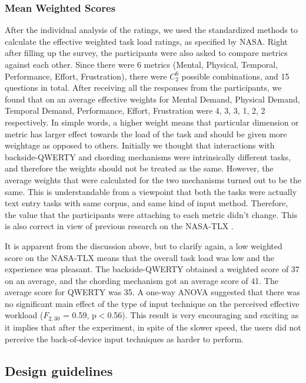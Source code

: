 \subsubsection{Mean Weighted Scores}
After the individual analysis of the ratings, we used the standardized methods to calculate the effective weighted task load ratings, as specified by NASA. Right after filling up the survey, the participants were also asked to compare metrics against each other. Since there were 6 metrics (Mental, Physical, Temporal, Performance, Effort, Frustration), there were $C_{2}^{6}$ possible combinations, and 15 questions in total. After receiving all the responses from the
participants, we found that on an average effective weights for Mental Demand, Physical Demand, Temporal Demand, Performance, Effort, Frustration were 4, 3, 3, 1, 2, 2 respectively. In simple words, a higher weight means that particular dimension or metric has larger effect towards the load of the task and should be given more weightage as opposed to others. Initially we thought that interactions with backside-QWERTY and chording mechanisms were intrinsically different tasks, and therefore the weights should not be treated as the same. However, the average weights that were calculated for the two mechanisms turned out to be the same. This is understandable from a viewpoint that both the tasks were actually text entry tasks with same corpus, and same kind of input method. Therefore, the value that the participants were attaching to each metric didn't change. This is also correct in view of previous research on the NASA-TLX .

It is apparent from the discussion above, but to clarify again, a low weighted score on the NASA-TLX means that the overall task load was low and the experience was pleasant. The backside-QWERTY obtained a weighted score of 37 on an average, and the chording mechanism got an average score of 41. The average score for QWERTY was 35. A one-way ANOVA suggested that there was no significant main effect of the type of input technique on the perceived effective workload ($F_{2,30}$ = 0.59, p$<$0.56). This result is very encouraging and exciting as it implies that after the experiment, in spite of the slower speed, the users did not perceive the back-of-device input techniques as harder to perform. 

\subsection{Design guidelines}

